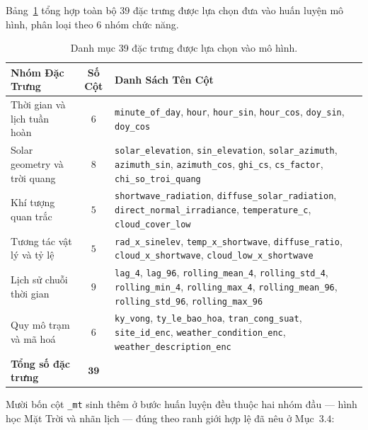 \documentclass[12pt, a4paper]{report}
\begin{document}
Bảng~\ref{tab:bo_dac_trung} tổng hợp toàn bộ $39$ đặc trưng được lựa chọn đưa vào huấn luyện mô hình, phân loại theo 6 nhóm chức năng.

\begin{table}[htbp]
\centering
\caption{Danh mục 39 đặc trưng được lựa chọn vào mô hình.}
\label{tab:bo_dac_trung}
\footnotesize
\renewcommand{\arraystretch}{1.08}
\begin{tabularx}{\textwidth}{@{} >{\raggedright\arraybackslash}p{3.8cm} c >{\raggedright\arraybackslash}X @{}}
\toprule
\textbf{Nhóm Đặc Trưng} & \textbf{Số Cột} & \textbf{Danh Sách Tên Cột} \\
\midrule
Thời gian và lịch tuần hoàn & $6$ &
\texttt{minute\_of\_day}, \texttt{hour}, \texttt{hour\_sin}, \texttt{hour\_cos}, \texttt{doy\_sin}, \texttt{doy\_cos} \\
\addlinespace[3pt]
Solar geometry và trời quang & $8$ &
\texttt{solar\_elevation}, \texttt{sin\_elevation}, \texttt{solar\_azimuth}, \texttt{azimuth\_sin}, \texttt{azimuth\_cos}, \texttt{ghi\_cs}, \texttt{cs\_factor}, \texttt{chi\_so\_troi\_quang} \\
\addlinespace[3pt]
Khí tượng quan trắc & $5$ &
\texttt{shortwave\_radiation}, \texttt{diffuse\_solar\_radiation}, \texttt{direct\_normal\_irradiance}, \texttt{temperature\_c}, \texttt{cloud\_cover\_low} \\
\addlinespace[3pt]
Tương tác vật lý và tỷ lệ & $5$ &
\texttt{rad\_x\_sinelev}, \texttt{temp\_x\_shortwave}, \texttt{diffuse\_ratio}, \texttt{cloud\_x\_shortwave}, \texttt{cloud\_low\_x\_shortwave} \\
\addlinespace[3pt]
Lịch sử chuỗi thời gian & $9$ &
\texttt{lag\_4}, \texttt{lag\_96}, \texttt{rolling\_mean\_4}, \texttt{rolling\_std\_4}, \texttt{rolling\_min\_4}, \texttt{rolling\_max\_4}, \texttt{rolling\_mean\_96}, \texttt{rolling\_std\_96}, \texttt{rolling\_max\_96} \\
\addlinespace[3pt]
Quy mô trạm và mã hoá & $6$ &
\texttt{ky\_vong}, \texttt{ty\_le\_bao\_hoa}, \texttt{tran\_cong\_suat}, \texttt{site\_id\_enc}, \texttt{weather\_condition\_enc}, \texttt{weather\_description\_enc} \\
\midrule
\textbf{Tổng số đặc trưng} & $\mathbf{39}$ & \\
\bottomrule
\end{tabularx}
\end{table}

\enlargethispage{3\baselineskip}
Mười bốn cột \texttt{\_mt} sinh thêm ở bước huấn luyện đều thuộc hai nhóm đầu --- hình học Mặt Trời
và nhãn lịch --- đúng theo ranh giới hợp lệ đã nêu ở Mục~$3.4$:
\end{document}
